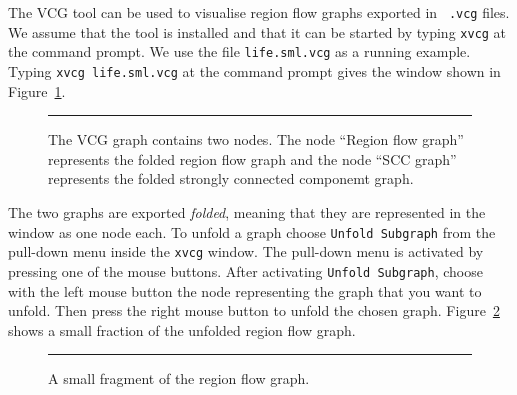 \documentclass[12pt]{book}
\begin{document}
The 
%
VCG tool can be used to visualise region flow graphs exported in {\tt
  .vcg} files. We assume that the tool is installed and that it can be
started by typing \texttt{xvcg} at the command prompt.  We use the file
\texttt{life.sml.vcg} as a running example. Typing \mbox{\texttt{xvcg
    life.sml.vcg}} at the command prompt gives the window shown in
Figure~\ref{vcg1.fig}.
\begin{figure}[htb]
\begin{center}
\end{center}
\caption{The VCG graph contains two nodes. The
  node ``Region flow graph'' represents the folded region flow graph and
  the node ``SCC graph'' represents the folded strongly connected
  componemt graph.}
\label{vcg1.fig}
\medskip\hrule
\end{figure}

The two graphs are exported \emph{folded}, meaning that they are
represented in the window as one node each. To unfold a graph choose
{\tt Unfold Subgraph} from the pull-down menu inside the {\tt xvcg}
window. The pull-down menu is activated by pressing one of the mouse
buttons. After activating {\tt Unfold Subgraph}, choose with the left mouse button the node
representing the graph that you want to unfold. Then press the right
mouse button to unfold the chosen graph. Figure~\ref{vcg2.fig}
shows a small fraction of the unfolded region flow graph.
\begin{figure}[htb]
\begin{center}
\end{center}
\caption{A small fragment of the region flow graph.}
\label{vcg2.fig}
\medskip\hrule
\end{figure}
\end{document}
